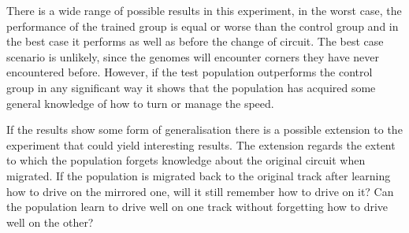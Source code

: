 \noindent
There is a wide range of possible results in this experiment, in the worst case, the performance of the trained group is equal or worse than the control group and in the best case it performs as well as before the change of circuit. The best case scenario is unlikely, since the genomes will encounter corners they have never encountered before. However, if the test population outperforms the control group in any significant way it shows that the population has acquired some general knowledge of how to turn or manage the speed. 

If the results show some form of generalisation there is a possible extension to the experiment that could yield interesting results. The extension regards the extent to which the population forgets knowledge about the original circuit when migrated. If the population is migrated back to the original track after learning how to drive on the mirrored one, will it still remember how to drive on it? Can the population learn to drive well on one track without forgetting how to drive well on the other?


